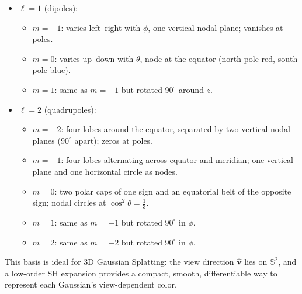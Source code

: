 \begin{enrichment}
\begin{enrichment}
\begin{enrichment}
\begin{itemize}
            \item $\ell=1$ (dipoles):
            \begin{itemize}
                \item $m=-1$: varies left–right with $\phi$, one vertical nodal plane; vanishes at poles.
                \item $m=0$: varies up–down with $\theta$, node at the equator (north pole red, south pole blue).
                \item $m=1$: same as $m=-1$ but rotated $90^\circ$ around $z$.
            \end{itemize}
            
            \item $\ell=2$ (quadrupoles):
            \begin{itemize}
                \item $m=-2$: four lobes around the equator, separated by two vertical nodal planes ($90^\circ$ apart); zeros at poles.
                \item $m=-1$: four lobes alternating across equator and meridian; one vertical plane and one horizontal circle as nodes.
                \item $m=0$: two polar caps of one sign and an equatorial belt of the opposite sign; nodal circles at $\cos^2\theta=\tfrac{1}{3}$.
                \item $m=1$: same as $m=-1$ but rotated $90^\circ$ in $\phi$.
                \item $m=2$: same as $m=-2$ but rotated $90^\circ$ in $\phi$.
            \end{itemize}
        \end{itemize}
        
        This basis is ideal for 3D Gaussian Splatting: the view direction $\hat{\mathbf v}$ lies on $\mathbb{S}^2$, and a low-order SH expansion provides a compact, smooth, differentiable way to represent each Gaussian’s view-dependent color.
        

\end{enrichment}
\end{enrichment}
\end{enrichment}
